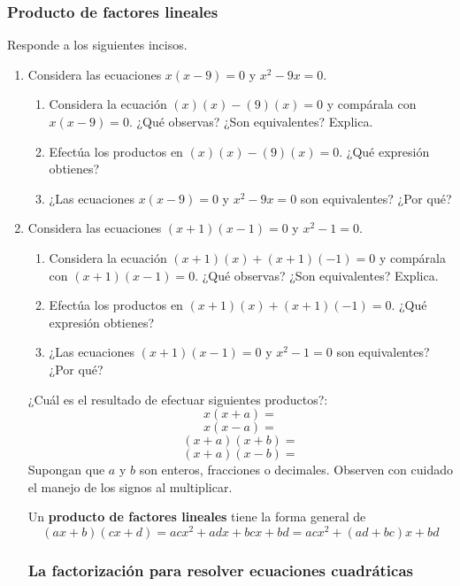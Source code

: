 \documentclass[11pt]{book}
\begin{document}
\newpage

\subsubsection{Producto de factores lineales}
Responde a los siguientes incisos.
\begin{enumerate}
    \item Considera las ecuaciones $x(x - 9) = 0$ y $x^2 - 9x = 0$.
          \begin{enumerate}
              \item Considera la ecuación $(x)(x) - (9)(x) = 0$ y compárala con $x(x - 9) = 0$. ¿Qué observas? ¿Son equivalentes? Explica.
              \item Efectúa los productos en $(x)(x) - (9)(x) = 0$. ¿Qué expresión obtienes?
              \item ¿Las ecuaciones $x(x - 9) = 0$ y $x^2 - 9x = 0$ son equivalentes? ¿Por qué?
          \end{enumerate}
    \item Considera las ecuaciones $(x + 1)(x - 1) = 0$ y $x^2 - 1 = 0$.
          \begin{enumerate}
              \item Considera la ecuación $(x + 1)(x) + (x + 1)(-1) = 0$ y compárala con
                    $(x + 1)(x - 1) = 0$. ¿Qué observas? ¿Son equivalentes? Explica.
              \item Efectúa los productos en $(x + 1)(x) + (x + 1)(-1) = 0$. ¿Qué expresión obtienes?
              \item ¿Las ecuaciones $(x + 1)(x - 1) = 0$ y $x^2 - 1 = 0$ son equivalentes? ¿Por qué?
          \end{enumerate}

          ¿Cuál es el resultado de efectuar siguientes productos?:
          \[x(x + a)=\]
          \[x(x - a)=\]
          \[(x + a)(x + b)=\]
          \[(x + a)(x - b)=\]
          Supongan que $a$ y $b$ son enteros, fracciones o decimales. Observen con cuidado el manejo de
          los signos al multiplicar.

          \begin{boxH}
              Un \textbf{producto de factores lineales} tiene la forma general de
              \[(ax + b)(cx + d) = acx^2 + adx + bcx + bd = acx^2 + (ad + bc)x + bd\]
          \end{boxH}

          \subsubsection{La factorización para resolver ecuaciones cuadráticas}


\end{enumerate}
\end{document}

